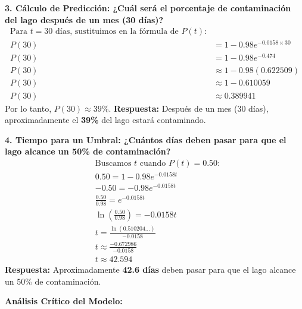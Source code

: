 \documentclass[12pt, a4paper]{article}
\begin{document}
\vspace{0.5em}
\noindent \textbf{3. Cálculo de Predicción: ¿Cuál será el porcentaje de contaminación del lago después de un mes (30 días)?}
\begin{align*}
\text{Para } t = 30 \text{ días, sustituimos en la fórmula de } P(t)\text{:} \\
P(30) &= 1 - 0.98e^{-0.0158 \times 30} \\
P(30) &= 1 - 0.98e^{-0.474} \\
P(30) &\approx 1 - 0.98(0.622509) \\
P(30) &\approx 1 - 0.610059 \\
P(30) &\approx 0.389941
\end{align*}
Por lo tanto, $P(30) \approx 39\%$.
\textbf{Respuesta:} Después de un mes (30 días), aproximadamente el \textbf{39\%} del lago estará contaminado.

\vspace{0.5em}
\noindent \textbf{4. Tiempo para un Umbral: ¿Cuántos días deben pasar para que el lago alcance un 50\% de contaminación?}
\begin{align*}
&\text{Buscamos } t \text{ cuando } P(t) = 0.50:\\
&0.50 = 1 - 0.98e^{-0.0158t} \\
&-0.50 = -0.98e^{-0.0158t} \\
&\frac{0.50}{0.98} = e^{-0.0158t} \\
&\ln\left(\frac{0.50}{0.98}\right) = -0.0158t \\
&t = \frac{\ln(0.510204...)}{-0.0158} \\
&t \approx \frac{-0.672986}{-0.0158} \\
&t \approx 42.594
\end{align*}
\textbf{Respuesta:} Aproximadamente \textbf{42.6 días} deben pasar para que el lago alcance un 50\% de contaminación.

\vspace{0.5em}
\noindent \textbf{Análisis Crítico del Modelo:}
\end{document}
